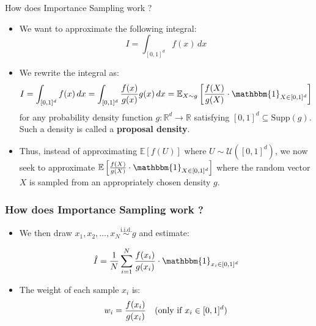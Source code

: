 \documentclass[aspectratio=169,xcolor=dvipsnames]{beamer}
\newcommand{\bdOne}{\mathbbm{1}}
\begin{document}
    \begin{frame}{How does Importance Sampling work ?}
        \begin{itemize}
            \item<1-> We want to approximate the following integral:
            \[I = \int_{[0,1]^d} f(x) \, dx\]

            \item<2-> We rewrite the integral as:
            \[I = \int_{[0,1]^d} f(x) \, dx = \int_{[0,1]^d} \frac{f(x)}{g(x)} g(x) \, dx = \mathbb{E}_{X \sim g} \left[ \frac{f(X)}{g(X)} \cdot \bdOne_{X \in [0,1]^d} \right]\]
            for any probability density function $g : \mathbb{R}^d \to \mathbb R$ satisfying $[0, 1]^d \subseteq \text{Supp}(g)$. Such a density is called a \textbf{proposal density}.

            \item<3-> Thus, instead of approximating $\mathbb{E}[f(U)]$ where $U \sim \mathcal{U}([0, 1]^d)$, we now seek to approximate $\mathbb{E}\left[\frac{f(X)}{g(X)} \cdot \bdOne_{X \in [0,1]^d}\right]$ where the random vector $X$ is sampled from an appropriately chosen density $g$.
        \end{itemize}
    \end{frame}


    \begin{frame}
        \frametitle{How does Importance Sampling work ?}
        \begin{itemize}
            \item<1->We then draw \( x_1, x_2, \dots, x_N \overset{\text{i.i.d.}}{\sim} g \) and estimate:
        
            \[
            \hat{I} = \frac{1}{N} \sum_{i=1}^N \frac{f(x_i)}{g(x_i)} \cdot \bdOne_{x_i \in [0,1]^d}
            \]
    
            \vspace{1em}
             \item<2->The weight of each sample \( x_i \) is:
            \[
            w_i = \frac{f(x_i)}{g(x_i)} \quad \text{(only if \( x_i \in [0,1]^d \))}
            \]
        \end{itemize}
    \end{frame}




    
\end{document}
